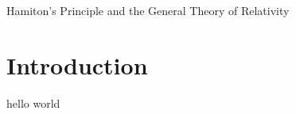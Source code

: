 \paperheader
	{Hamiton's Principle and the General Theory of Relativity}
	{}
	{}


\section{Introduction}
hello world